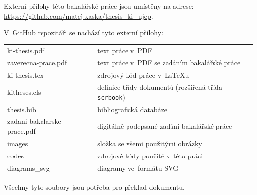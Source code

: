 \documentclass[male,czech,api_bc]{kitheses}
\begin{document}
Externí přílohy této bakalářské práce jsou umístěny na adrese:\\ \url{https://github.com/matej-kaska/thesis_ki_ujep}.

V~GitHub repozitáři se nachází tyto externí přílohy:

\begin{longtable}{ll}
	\hline
	ki-thesis.pdf & text práce v~PDF \\
	zaverecna-prace.pdf & text práce v~PDF se zadáním bakalářské práce \\
	ki-thesis.tex & zdrojový kód práce v~\LaTeX{}u \\
	kitheses.cls & definice třídy dokumentů (rozšířená třída \texttt{scrbook})\\
	thesis.bib & bibliografická databáze \\
	zadani-bakalarske-prace.pdf & digitálně podepsané zadání bakalářské práce\\
	images & složka se všemi použitými obrázky \\
	codes & zdrojové kódy použité v~této práci \\
	diagrams\_svg & diagramy ve~formátu SVG \\
	\hline
\end{longtable}

Všechny tyto soubory jsou potřeba pro překlad dokumentu.
\end{document}
